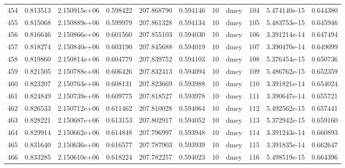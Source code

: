 \begin{tabular}{lrrrrrrlrrr}
454  &    0.813513 &        2.150915e+06 &  0.598422 &              207.868790 &    0.594146 &      10 &         dmey &    104 &   5.474140e-15 &      0.644380 \\
455  &    0.815068 &        2.150889e+06 &  0.599979 &              207.861328 &    0.594134 &      10 &         dmey &    105 &   5.483753e-15 &      0.645946 \\
456  &    0.816646 &        2.150866e+06 &  0.601560 &              207.855103 &    0.594030 &      10 &         dmey &    106 &   3.391214e-14 &      0.647494 \\
457  &    0.818274 &        2.150840e+06 &  0.603190 &              207.845688 &    0.594019 &      10 &         dmey &    107 &   3.390470e-14 &      0.649099 \\
458  &    0.819860 &        2.150814e+06 &  0.604779 &              207.839752 &    0.594103 &      10 &         dmey &    108 &   5.376454e-15 &      0.650736 \\
459  &    0.821505 &        2.150788e+06 &  0.606426 &              207.832413 &    0.594094 &      10 &         dmey &    109 &   5.486762e-15 &      0.652359 \\
460  &    0.823207 &        2.150763e+06 &  0.608131 &              207.823669 &    0.593988 &      10 &         dmey &    110 &   3.391821e-14 &      0.654024 \\
461  &    0.824849 &        2.150739e+06 &  0.609775 &              207.818527 &    0.593978 &      10 &         dmey &    111 &   3.390647e-14 &      0.655721 \\
462  &    0.826533 &        2.150712e+06 &  0.611462 &              207.810028 &    0.594064 &      10 &         dmey &    112 &   5.492562e-15 &      0.657441 \\
463  &    0.828221 &        2.150687e+06 &  0.613153 &              207.802917 &    0.594052 &      10 &         dmey &    113 &   5.372942e-15 &      0.659160 \\
464  &    0.829914 &        2.150662e+06 &  0.614848 &              207.796997 &    0.593948 &      10 &         dmey &    114 &   3.391243e-14 &      0.660893 \\
465  &    0.831640 &        2.150636e+06 &  0.616577 &              207.787903 &    0.593939 &      10 &         dmey &    115 &   3.391835e-14 &      0.662647 \\
466  &    0.833285 &        2.150610e+06 &  0.618224 &              207.782257 &    0.594023 &      10 &         dmey &    116 &   5.498519e-15 &      0.664396 \\

\end{tabular}
